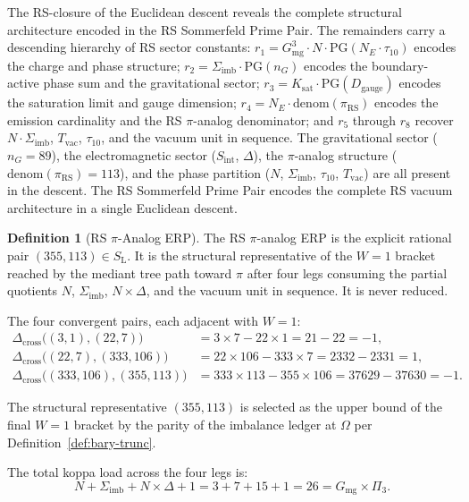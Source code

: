 \documentclass[11pt, letterpaper]{article}
\newcommand{\SL}{S_{\mathrm{L}}}
\newcommand{\Dcross}{\Delta_{\mathrm{cross}}}
\newcommand{\Dg}{D_{\mathrm{gauge}}}
\newcommand{\Sint}{S_{\mathrm{int}}}
\newcommand{\Sigimb}{\Sigma_{\mathrm{imb}}}
\newcommand{\PG}{\mathrm{PG}}
\newcommand{\Gmg}{G_{\mathrm{mg}}}
\newcommand{\Ksat}{K_{\mathrm{sat}}}
\newcommand{\Tvac}{T_{\mathrm{vac}}}
\newcommand{\tauX}{\tau_{10}}
\newcommand{\Pithree}{\Pi_3}
\newcommand{\nG}{n_G}
\newcommand{\piRS}{\pi_{\mathrm{RS}}}
\theoremstyle{definition}
\newtheorem{definition}{Definition}[section]
\theoremstyle{plain}
\begin{document}
\begin{observebox}
The RS-closure of the Euclidean descent reveals the complete structural
architecture encoded in the RS Sommerfeld Prime Pair.  The remainders carry
a descending hierarchy of RS sector constants: $r_1=\Gmg^3\cdot
N\cdot\PG(N_E\cdot\tauX)$ encodes the charge and phase structure; $r_2=
\Sigimb\cdot\PG(\nG)$ encodes the boundary-active phase sum and the
gravitational sector; $r_3=\Ksat\cdot\PG(\Dg)$ encodes the saturation
limit and gauge dimension; $r_4=N_E\cdot\mathrm{denom}(\piRS)$ encodes the emission
cardinality and the RS $\pi$-analog denominator; and $r_5$ through $r_8$
recover $N\cdot\Sigimb$, $\Tvac$, $\tauX$, and the vacuum unit in sequence.
The gravitational sector ($\nG=89$), the electromagnetic sector ($\Sint$,
$\Delta$), the $\pi$-analog structure ($\mathrm{denom}(\piRS)=113$), and the phase
partition ($N$, $\Sigimb$, $\tauX$, $\Tvac$) are all present in the descent.
The RS Sommerfeld Prime Pair encodes the complete RS vacuum architecture in
a single Euclidean descent.
\end{observebox}


\begin{definition}[RS $\pi$-Analog ERP]\label{def:pi-analog}
The RS $\pi$-analog ERP is the explicit rational pair $(355,113)\in\SL$.  It
is the structural representative of the $W=1$ bracket reached by the mediant
tree path toward $\pi$ after four legs consuming the partial quotients $N$,
$\Sigimb$, $N\times\Delta$, and the vacuum unit in sequence.  It is never
reduced.

The four convergent pairs, each adjacent with $W=1$:
\begin{align*}
\Dcross\!\bigl((3,1),(22,7)\bigr)
  &= 3\times7-22\times1 = 21-22 = -1,\\
\Dcross\!\bigl((22,7),(333,106)\bigr)
  &= 22\times106-333\times7 = 2332-2331 = 1,\\
\Dcross\!\bigl((333,106),(355,113)\bigr)
  &= 333\times113-355\times106 = 37629-37630 = -1.
\end{align*}

The structural representative $(355,113)$ is selected as the upper bound of
the final $W=1$ bracket by the parity of the imbalance ledger at $\Omega$ per
Definition~\ref{def:bary-trunc}.

The total koppa load across the four legs is:
\[
N+\Sigimb+N\times\Delta+1 = 3+7+15+1 = 26 = \Gmg\times\Pithree.
\]
\end{definition}
\end{document}
